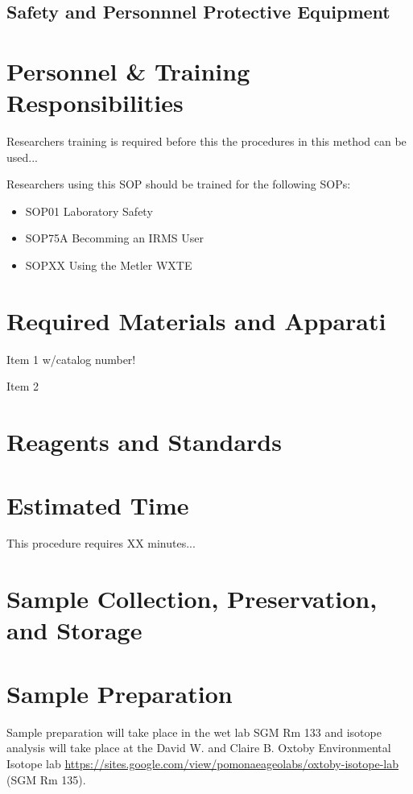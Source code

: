 \documentclass[12pt]{../SOP4_alpha}\usepackage[]{graphicx}\usepackage[]{color}
\begin{document}
\subsection{Safety and Personnnel Protective Equipment}


\section{Personnel \& Training Responsibilities}

\NP Researchers training is required before this the procedures in this method can be used... 

\NP Researchers using this SOP should be trained for the following SOPs:

\begin{itemize}
  \item SOP01 Laboratory Safety
  \item SOP75A Becomming an IRMS User
  \item SOPXX Using the Metler WXTE
\end{itemize}

\section{Required Materials and Apparati}

\NP Item 1 w/catalog number!

\NP Item 2

\section{Reagents and Standards}

\section{Estimated Time}

\NP This procedure requires XX minutes...

\section{Sample Collection, Preservation, and Storage}


\section{Sample Preparation}

\NP Sample preparation will take place in the wet lab SGM Rm 133 and isotope analysis will take place at the David W. and Claire B. Oxtoby Environmental Isotope lab \url{https://sites.google.com/view/pomonaeageolabs/oxtoby-isotope-lab} (SGM Rm 135).
\end{document}
